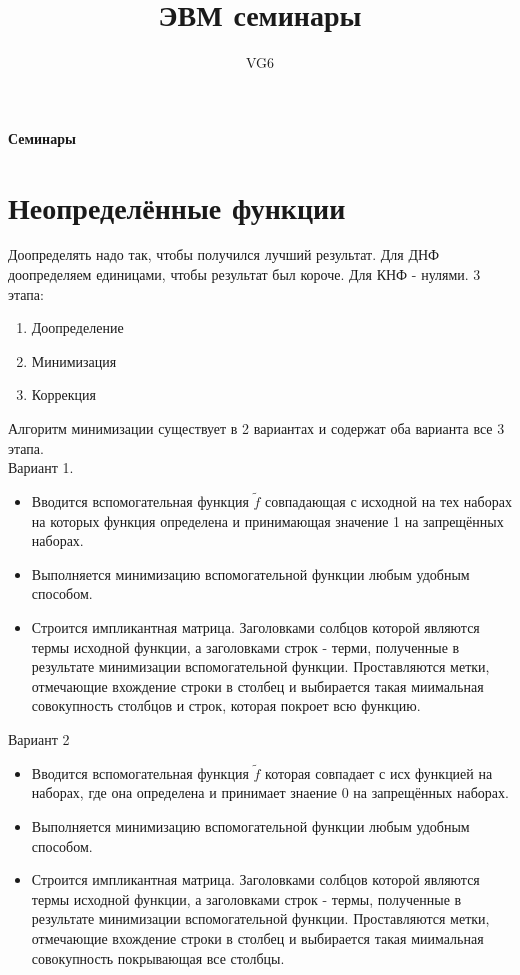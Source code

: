 \documentclass[12px]{article}
\title{ЭВМ семинары}
\author{VG6}
\begin{document}
\begin{center}
	\textbf{Семинары}
\end{center}

\section{Неопределённые функции}
Доопределять надо так, чтобы получился лучший результат. Для ДНФ доопределяем единицами, чтобы результат был короче. Для КНФ - нулями.
3 этапа:
\begin{enumerate}
	\item Доопределение
	\item Минимизация
	\item Коррекция		
\end{enumerate}

Алгоритм минимизации существует в 2 вариантах и содержат оба варианта все 3 этапа.\\
Вариант 1. 
\begin{itemize}
	\item Вводится вспомогательная функция $\tilde{f}$ совпадающая с исходной на тех наборах на которых функция определена и принимающая значение 1 на запрещённых наборах.
	\item Выполняется минимизацию вспомогательной функции любым удобным способом.
	\item Строится импликантная матрица. Заголовками солбцов которой являются термы исходной функции, а заголовками строк - терми, полученные в результате минимизации вспомогательной функции. Проставляются метки, отмечающие вхождение строки в столбец и выбирается такая миимальная совокупность столбцов и строк, которая покроет всю функцию.
\end{itemize}
Вариант 2
\begin{itemize}
	\item Вводится вспомогательная функция $\tilde{f}$ которая совпадает с исх функцией на наборах, где она определена и принимает знаение 0 на запрещённых наборах.
	\item Выполняется минимизацию вспомогательной функции любым удобным способом.
	\item Строится импликантная матрица. Заголовками солбцов которой являются термы исходной функции, а заголовками строк - термы, полученные в результате минимизации вспомогательной функции. Проставляются метки, отмечающие вхождение строки в столбец и выбирается такая миимальная совокупность покрывающая все столбцы.
\end{itemize}
\end{document}
